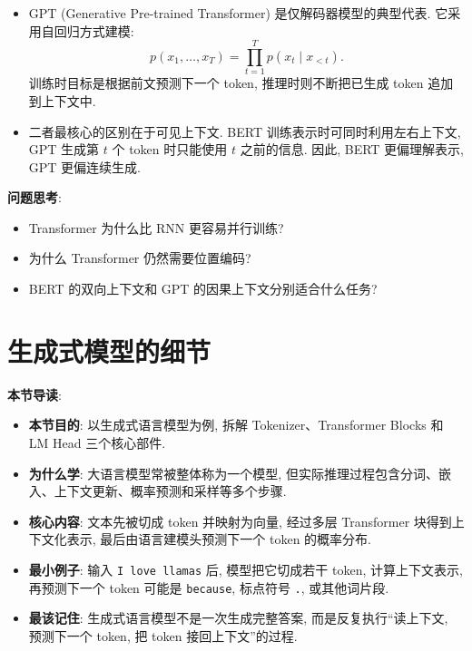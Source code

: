 \documentclass{../nndlcourse}
\begin{document}
\begin{enumerate}
\begin{itemize}
      \item GPT (Generative Pre-trained Transformer) 是仅解码器模型的典型代表. 它采用自回归方式建模:
      \begin{equation*}
        p(x_1,\ldots,x_T) = \prod_{t=1}^{T}p(x_t \mid x_{<t}).
      \end{equation*}
      训练时目标是根据前文预测下一个 token, 推理时则不断把已生成 token 追加到上下文中.
      \item 二者最核心的区别在于可见上下文. BERT 训练表示时可同时利用左右上下文, GPT 生成第 $t$ 个 token 时只能使用 $t$ 之前的信息. 因此, BERT 更偏理解表示, GPT 更偏连续生成.
    \end{itemize}
\end{enumerate}

\textbf{问题思考}:
\begin{itemize}
  \item Transformer 为什么比 RNN 更容易并行训练?
  \item 为什么 Transformer 仍然需要位置编码?
  \item BERT 的双向上下文和 GPT 的因果上下文分别适合什么任务?
\end{itemize}

\section{生成式模型的细节}

\textbf{本节导读}:
\begin{itemize}
  \item \textbf{本节目的}: 以生成式语言模型为例, 拆解 Tokenizer、Transformer Blocks 和 LM Head 三个核心部件.
  \item \textbf{为什么学}: 大语言模型常被整体称为一个模型, 但实际推理过程包含分词、嵌入、上下文更新、概率预测和采样等多个步骤.
  \item \textbf{核心内容}: 文本先被切成 token 并映射为向量, 经过多层 Transformer 块得到上下文化表示, 最后由语言建模头预测下一个 token 的概率分布.
  \item \textbf{最小例子}: 输入 \texttt{I love llamas} 后, 模型把它切成若干 token, 计算上下文表示, 再预测下一个 token 可能是 \texttt{because}, 标点符号 \texttt{.}, 或其他词片段.
  \item \textbf{最该记住}: 生成式语言模型不是一次生成完整答案, 而是反复执行“读上下文, 预测下一个 token, 把 token 接回上下文”的过程.
\end{itemize}
\end{document}
